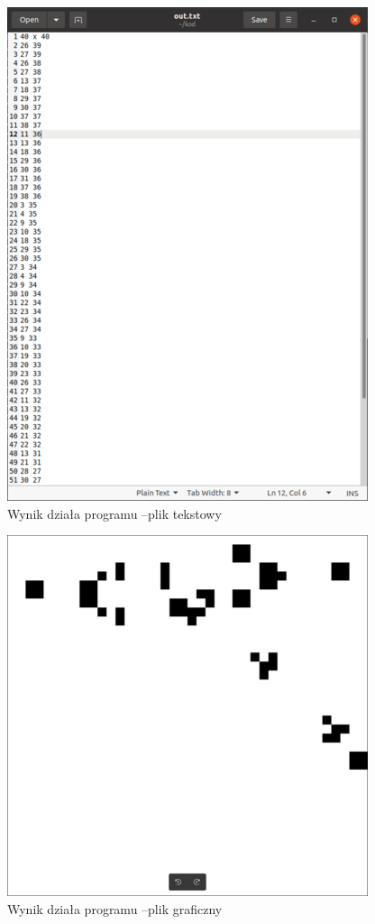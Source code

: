 \documentclass[11pt,a4paper]{report}
\begin{document}
\begin {itemize}
\begin{figure}[!hp]
\centerline{\includegraphics{img/output_gosperglidergun4.png}}
\caption{Wynik działa programu --plik tekstowy}
\end{figure}
\begin{figure}[!ht]
\centerline{\includegraphics{img/output_gosperglidergun3.png}}
\caption{Wynik działa programu --plik graficzny}
\end{figure}
\end {itemize}
\newpage
\end{document}
